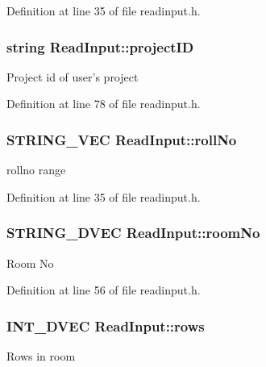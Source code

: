 Definition at line 35 of file readinput.\-h.

\hypertarget{classReadInput_a3ad470a25b3e0a29466bf4ff1f7d8e81}{
\subsubsection[{project\-I\-D}]{\setlength{\rightskip}{0pt plus 5cm}string Read\-Input\-::project\-I\-D\hspace{0.3cm}{\ttfamily [protected]}}}\label{classReadInput_a3ad470a25b3e0a29466bf4ff1f7d8e81}
Project id of user's project 

Definition at line 78 of file readinput.\-h.

\hypertarget{classReadInput_a862fbffdffa56fc6d66b1d1f14dae087}{
\subsubsection[{roll\-No}]{\setlength{\rightskip}{0pt plus 5cm}S\-T\-R\-I\-N\-G\-\_\-\-V\-E\-C Read\-Input\-::roll\-No\hspace{0.3cm}{\ttfamily [protected]}}}\label{classReadInput_a862fbffdffa56fc6d66b1d1f14dae087}
rollno range 

Definition at line 35 of file readinput.\-h.

\hypertarget{classReadInput_a77f996670554c8a752e7cbd713ecb084}{
\subsubsection[{room\-No}]{\setlength{\rightskip}{0pt plus 5cm}S\-T\-R\-I\-N\-G\-\_\-D\-V\-E\-C Read\-Input\-::room\-No\hspace{0.3cm}{\ttfamily [protected]}}}\label{classReadInput_a77f996670554c8a752e7cbd713ecb084}
Room No 

Definition at line 56 of file readinput.\-h.

\hypertarget{classReadInput_ac853c80a2fad7a58fecde30db9fc93df}{
\subsubsection[{rows}]{\setlength{\rightskip}{0pt plus 5cm}I\-N\-T\-\_\-D\-V\-E\-C Read\-Input\-::rows\hspace{0.3cm}{\ttfamily [protected]}}}\label{classReadInput_ac853c80a2fad7a58fecde30db9fc93df}
Rows in room 

